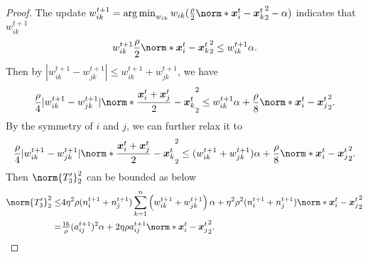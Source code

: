 \documentclass{article}
\begin{document}
\begin{proof}
  The update $w^{t+1}_{ik} = \argmin_{w_{ik}} w_{ik} (\frac{\rho}{2}\norm*{ \xx_i^t - \xx_k^t }_2^2 - \alpha) $
  indicates that $w^{t+1}_{ik} $
  \begin{align*}
    w^{t+1}_{ik}  \frac{\rho}{2}\norm*{ \xx_i^t - \xx_k^t }_2^2  \le w^{t+1}_{ik} \alpha.
  \end{align*}
  Then by $|w_{ik}^{t+1}-w_{jk}^{t+1}|\le w_{ik}^{t+1}+w_{jk}^{t+1}$, we have
  \begin{align*}
    \frac{\rho}{4}|w_{ik}^{t+1}-w_{jk}^{t+1}| \norm*{ \frac{\xx_i^t+\xx_j^t}{2}  - \xx_k^t }_2^2
    \le w_{ik}^{t+1} \alpha
    + \frac{\rho}{8} \norm*{ \xx_i^t-\xx_j^t }_2^2.
  \end{align*}
  By the symmetry of $i$ and $j$, we can further relax it to
  \begin{align*}
    \frac{\rho}{4}|w_{ik}^{t+1}-w_{jk}^{t+1}| \norm*{ \frac{\xx_i^t+\xx_j^t}{2}  - \xx_k^t }_2^2
    \le (w_{ik}^{t+1}+w_{jk}^{t+1}) \alpha
    + \frac{\rho}{8} \norm*{ \xx_i^t-\xx_j^t }_2^2.
  \end{align*}
  Then $\norm{T_3'}_2^2$ can be bounded as below
  \begin{equation}\label{eq:consensus-distance:T3}
    \begin{split}      
    \norm{T_3'}_2^2
    \le& 4\eta^2 \rho (n_i^{t+1} + n_j^{t+1}) \sum_{k=1}^n \left( w_{ik}^{t+1} +  w_{jk}^{t+1} \right)\alpha 
    + \eta^2\rho^2 (n_i^{t+1} + n_j^{t+1}) \norm*{ \xx_i^t-\xx_j^t }_2^2 \\
    =& \tfrac{16}{\rho}(a_{ij}^{t+1})^2\alpha + 2\eta\rho a_{ij}^{t+1} \norm*{ \xx_i^t-\xx_j^t }_2^2.
  \end{split}
\end{equation}


\end{proof}
\end{document}
